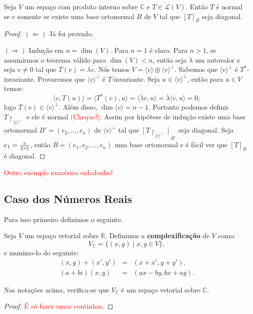 \documentclass[11pt,twoside,a4paper]{book}
\begin{document}
\begin{teorema}
Seja $V$ um espaço com produto interno sobre $\mathbb{C}$ e $T\in\mathcal{L}(V)$. Então $T$ é normal se e somente se existe uma base ortonormal $B$ de $V$ tal que $[T]_B$ seja diagonal.
\end{teorema}
\begin{proof}
$(\Leftarrow)$ Já foi provado.

\medskip
\noindent
$(\Rightarrow)$ Indução em $n=\dim(V)$. Para $n=1$ é claro. Para $n>1$, se assumirmos o teorema válido para $\dim(V)<n$, então seja $\lambda$ um autovalor e seja $v\neq 0$ tal que $T(v)=\lambda v$. Nós temos $V=\langle v\rangle\oplus\langle v\rangle^\perp$. Sabemos que $\langle v\rangle^\perp$ é $T^*$-invariante. Provaremos que $\langle v\rangle^\perp$ é $T$-invariante. Seja $u\in\langle v\rangle^\perp$, então para $u\in V$ temos:
\[
\langle v,T(u)\rangle=\langle T^*(v),u\rangle=\langle \overline{\lambda}v,u\rangle=\overline{\lambda}\langle v,u\rangle=0;
\]
logo $T(v)\in\langle v\rangle^\perp$. Além disso, $\dim\langle v\rangle=n-1$. Portanto podemos definir $T\upharpoonright_{\langle v\rangle^\perp}$ e ele é normal \textcolor{red}{(Cheque!)}. Assim por hipótese de indução existe uma base ortonormal $B'=(e_2,\dots,e_n)$ de $\langle v\rangle^\perp$ tal que $[T\upharpoonright_{\langle v\rangle^\perp}]_{B'}$ seja diagonal. Seja $e_1=\frac{v}{\norm{v}}$, então $B=(e_1,e_2,\dots,e_n)$ uma base ortonormal e é fácil ver que $[T]_B$ é diagonal.
\end{proof}

\noindent
\textcolor{red}{Outro exemplo numérico enfadonho!}

\subsection{Caso dos Números Reais}

Para isso primeiro definimos o seguinte.

\begin{definicao}
Seja $V$ um espaço vetorial sobre $\mathbb{R}$. Definimos a \textbf{complexificação} de $V$ como:
\[
V_\mathbb{C}=\{(x,y)\mid x,y\in V\},
\]
e munimo-lo do seguinte:
\[
\begin{array}{rcl}
(x,y)+(x',y')&=&(x+x',y+y').\\
(a+bi)(x,y)&=&(ax-by,bx+ay).
\end{array}
\]
\end{definicao}

\begin{proposicao}
Nas notações acima, verifica-se que $V_\mathbb{C}$ é um espaço vetorial sobre $\mathbb{C}$.
\end{proposicao}
\begin{proof}
\textcolor{red}{É só fazer umas continhas.}
\end{proof}
\end{document}
